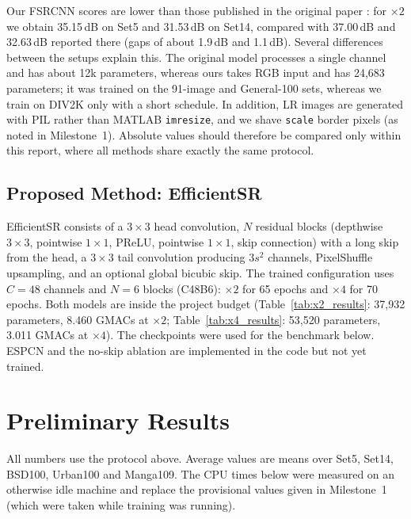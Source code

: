 \documentclass[11pt]{article}
\begin{document}
Our FSRCNN scores are lower than those published in the original paper \citep{dong2016fsrcnn}:
for $\times2$ we obtain 35.15\,dB on Set5 and 31.53\,dB on Set14, compared with 37.00\,dB and
32.63\,dB reported there (gaps of about 1.9\,dB and 1.1\,dB). Several differences between the
setups explain this. The original model processes a single channel and has about 12k parameters,
whereas ours takes RGB input and has 24,683 parameters; it was trained on the 91-image and
General-100 sets, whereas we train on DIV2K only with a short schedule. In addition, LR images are
generated with PIL rather than MATLAB \texttt{imresize}, and we shave \texttt{scale} border pixels
(as noted in Milestone~1). Absolute values should therefore be compared only within this report,
where all methods share exactly the same protocol.

\subsection{Proposed Method: EfficientSR}
EfficientSR consists of a $3\times3$ head convolution, $N$ residual blocks (depthwise $3\times3$, pointwise $1\times1$, PReLU, pointwise $1\times1$, skip connection) with a long skip from the head, a $3\times3$ tail convolution producing $3s^2$ channels, PixelShuffle upsampling, and an optional global bicubic skip. The trained configuration uses $C=48$ channels and $N=6$ blocks (C48B6): $\times2$ for 65 epochs and $\times4$ for 70 epochs. Both models are inside the project budget (Table~\ref{tab:x2_results}: 37{,}932 parameters, 8.460 GMACs at $\times2$; Table~\ref{tab:x4_results}: 53{,}520 parameters, 3.011 GMACs at $\times4$). The checkpoints were used for the benchmark below. ESPCN and the no-skip ablation are implemented in the code but not yet trained.

\section{Preliminary Results}
\label{sec:results}
All numbers use the protocol above. Average values are means over Set5, Set14, BSD100, Urban100 and Manga109. The CPU times below were measured on an otherwise idle machine and replace the provisional values given in Milestone~1 (which were taken while training was running).
\end{document}
